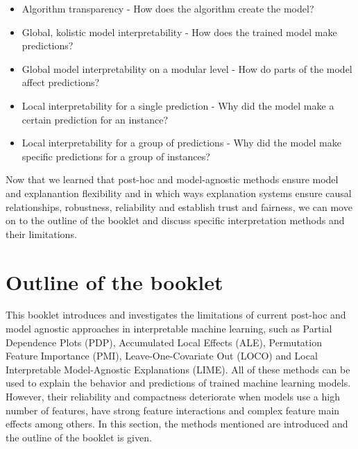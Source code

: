 \documentclass[]{krantz}
\providecommand{\tightlist}{%
  \setlength{\itemsep}{0pt}\setlength{\parskip}{0pt}}
\begin{document}
\begin{itemize}
\tightlist
\item
  Algorithm transparency - How does the algorithm create the model?
\item
  Global, kolistic model interpretability - How does the trained model
  make predictions?
\item
  Global model interpretability on a modular level - How do parts of the
  model affect predictions?
\item
  Local interpretability for a single prediction - Why did the model
  make a certain prediction for an instance?
\item
  Local interpretability for a group of predictions - Why did the model
  make specific predictions for a group of instances?
\end{itemize}

Now that we learned that post-hoc and model-agnostic methods ensure
model and explanantion flexibility and in which ways explanation systems
ensure causal relationships, robustness, reliability and establish trust
and fairness, we can move on to the outline of the booklet and discuss
specific interpretation methods and their limitations.

\section{Outline of the booklet}\label{outline-of-the-booklet}

This booklet introduces and investigates the limitations of current
post-hoc and model agnostic approaches in interpretable machine
learning, such as Partial Dependence Plots (PDP), Accumulated Local
Effects (ALE), Permutation Feature Importance (PMI), Leave-One-Covariate
Out (LOCO) and Local Interpretable Model-Agnostic Explanations (LIME).
All of these methods can be used to explain the behavior and predictions
of trained machine learning models. However, their reliability and
compactness deteriorate when models use a high number of features, have
strong feature interactions and complex feature main effects among
others. In this section, the methods mentioned are introduced and the
outline of the booklet is given.
\end{document}
